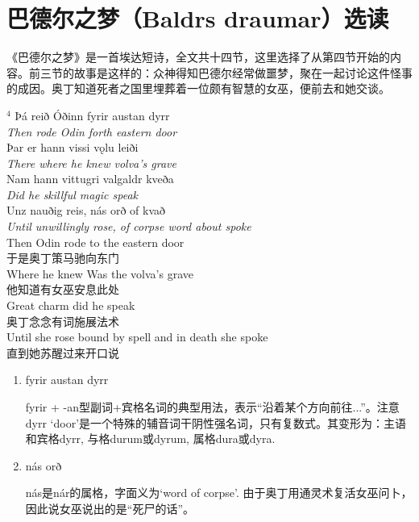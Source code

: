 \section{巴德尔之梦（Baldrs draumar）选读}
《巴德尔之梦》是一首埃达短诗，全文共十四节，这里选择了从第四节开始的内容。前三节的故事是这样的：众神得知巴德尔经常做噩梦，聚在一起讨论这件怪事的成因。奥丁知道死者之国里埋葬着一位颇有智慧的女巫，便前去和她交谈。
\begin{paracol}{2}
  \noindent
  $^4$ Þá reið Óðinn fyrir austan dyrr\\
  \textit{\MakeUppercase Then rode Odin forth eastern door}\\
  \MakeUppercase þar er hann vissi vǫlu leiði\\
  \textit{\MakeUppercase there where he knew volva's grave}\\
  \MakeUppercase nam hann vittugri valgaldr kveða\\
  \textit{\MakeUppercase did he skillful magic speak}\\
  \MakeUppercase unz nauðig reis, nás orð of kvað\\
  \textit{\MakeUppercase Until unwillingly rose, of corpse word about spoke}\\
  \switchcolumn
  \noindent
  Then Odin rode to the eastern door\\
  于是奥丁策马驰向东门\\
  Where he knew Was the volva's grave\\
  他知道有女巫安息此处\\
  Great charm did he speak\\
  奥丁念念有词施展法术\\
  Until she rose bound by spell and in death she spoke\\
  直到她苏醒过来开口说\\
\end{paracol}
\begin{grammar*}{}
  \begin{enumerate}[leftmargin=*]
    \item fyrir austan dyrr

          fyrir + -an型副词+宾格名词的典型用法，表示“沿着某个方向前往...”。注意dyrr `door'是一个特殊的辅音词干阴性强名词，只有复数式。其变形为：主语和宾格dyrr, 与格durum或dyrum, 属格dura或dyra.

    \item nás orð

          nás是nár的属格，字面义为`word of corpse'. 由于奥丁用通灵术复活女巫问卜，因此说女巫说出的是“死尸的话”。
  \end{enumerate}
\end{grammar*}

